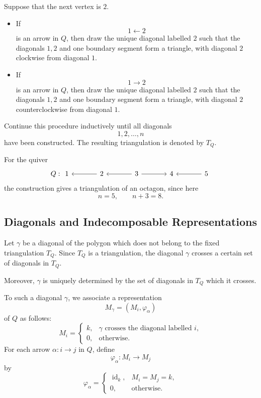 \documentclass[11pt, a4paper]{report}
\begin{document}
Suppose that the next vertex is \(2\).

\begin{itemize}
    \item If
    \[
        1\longleftarrow 2
    \]
    is an arrow in \(Q\), then draw the unique diagonal labelled \(2\) such that
    the diagonals \(1,2\) and one boundary segment form a triangle, with diagonal
    \(2\) clockwise from diagonal \(1\).

    \item If
    \[
        1\longrightarrow 2
    \]
    is an arrow in \(Q\), then draw the unique diagonal labelled \(2\) such that
    the diagonals \(1,2\) and one boundary segment form a triangle, with diagonal
    \(2\) counterclockwise from diagonal \(1\).
\end{itemize}

Continue this procedure inductively until all diagonals
\[
    1,2,\dots,n
\]
have been constructed. The resulting triangulation is denoted by \(T_Q\).

\begin{example}
    For the quiver
    \[
    Q:
    \begin{tikzcd}[column sep=large]
        1 & 2 \arrow[l] & 3 \arrow[l] \arrow[r] & 4 & 5 \arrow[l]
    \end{tikzcd}
    \]
    the construction gives a triangulation of an octagon, since here
    \[
        n=5,
        \qquad
        n+3=8.
    \]
\end{example}

\subsection{Diagonals and Indecomposable Representations}

Let \(\gamma\) be a diagonal of the polygon which does not belong to the fixed
triangulation \(T_Q\). Since \(T_Q\) is a triangulation, the diagonal \(\gamma\)
crosses a certain set of diagonals in \(T_Q\).

Moreover, \(\gamma\) is uniquely determined by the set of diagonals in \(T_Q\)
which it crosses.

To such a diagonal \(\gamma\), we associate a representation
\[
    M_\gamma=(M_i,\varphi_\alpha)
\]
of \(Q\) as follows:
\[
    M_i=
    \begin{cases}
        k, & \gamma \text{ crosses the diagonal labelled } i,\\
        0, & \text{otherwise}.
    \end{cases}
\]
For each arrow \(\alpha:i\to j\) in \(Q\), define
\[
    \varphi_\alpha:M_i\longrightarrow M_j
\]
by
\[
    \varphi_\alpha=
    \begin{cases}
        \operatorname{id}_k, & M_i=M_j=k,\\
        0, & \text{otherwise}.
    \end{cases}
\]
\end{document}
